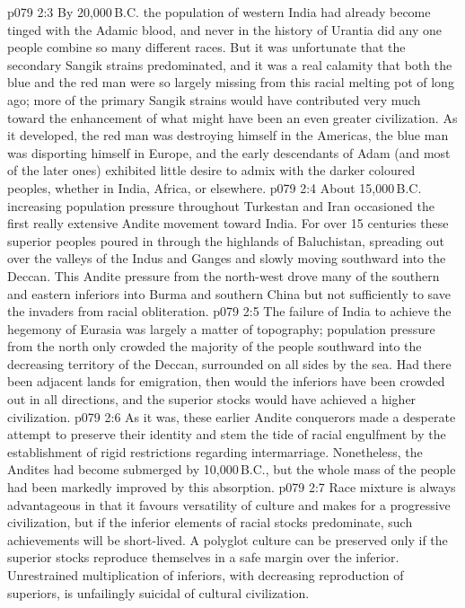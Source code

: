 \vs p079 2:3 \pc By 20,000\,B.C. the population of western India had already become tinged with the Adamic blood, and never in the history of Urantia did any one people combine so many different races. But it was unfortunate that the secondary Sangik strains predominated, and it was a real calamity that both the blue and the red man were so largely missing from this racial melting pot of long ago; more of the primary Sangik strains would have contributed very much toward the enhancement of what might have been an even greater civilization. As it developed, the red man was destroying himself in the Americas, the blue man was disporting himself in Europe, and the early descendants of Adam (and most of the later ones) exhibited little desire to admix with the darker coloured peoples, whether in India, Africa, or elsewhere.
\vs p079 2:4 \pc About 15,000\,B.C. increasing population pressure throughout Turkestan and Iran occasioned the first really extensive Andite movement toward India. For over 15 centuries these superior peoples poured in through the highlands of Baluchistan, spreading out over the valleys of the Indus and Ganges and slowly moving southward into the Deccan. This Andite pressure from the north\hyp{}west drove many of the southern and eastern inferiors into Burma and southern China but not sufficiently to save the invaders from racial obliteration.
\vs p079 2:5 The failure of India to achieve the hegemony of Eurasia was largely a matter of topography; population pressure from the north only crowded the majority of the people southward into the decreasing territory of the Deccan, surrounded on all sides by the sea. Had there been adjacent lands for emigration, then would the inferiors have been crowded out in all directions, and the superior stocks would have achieved a higher civilization.
\vs p079 2:6 As it was, these earlier Andite conquerors made a desperate attempt to preserve their identity and stem the tide of racial engulfment by the establishment of rigid restrictions regarding intermarriage. Nonetheless, the Andites had become submerged by 10,000\,B.C., but the whole mass of the people had been markedly improved by this absorption.
\vs p079 2:7 \pc Race mixture is always advantageous in that it favours versatility of culture and makes for a progressive civilization, but if the inferior elements of racial stocks predominate, such achievements will be short\hyp{}lived. A polyglot culture can be preserved only if the superior stocks reproduce themselves in a safe margin over the inferior. Unrestrained multiplication of inferiors, with decreasing reproduction of superiors, is unfailingly suicidal of cultural civilization.
